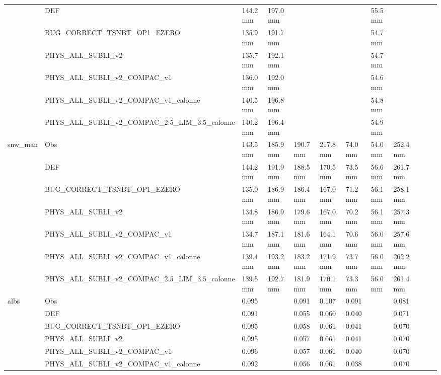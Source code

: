 \begin{tabular}{llllllllllll}
 & DEF & 144.2 mm & 197.0 mm &  &  &  & 55.5 mm &  &  &  &  \\
 & BUG_CORRECT_TSNBT_OP1_EZERO & 135.9 mm & 191.7 mm &  &  &  & 54.7 mm &  &  &  &  \\
 & PHYS_ALL_SUBLI_v2 & 135.7 mm & 192.1 mm &  &  &  & 54.7 mm &  &  &  &  \\
 & PHYS_ALL_SUBLI_v2_COMPAC_v1 & 136.0 mm & 192.0 mm &  &  &  & 54.6 mm &  &  &  &  \\
 & PHYS_ALL_SUBLI_v2_COMPAC_v1_calonne & 140.5 mm & 196.8 mm &  &  &  & 54.8 mm &  &  &  &  \\
 & PHYS_ALL_SUBLI_v2_COMPAC_2.5_LIM_3.5_calonne & 140.2 mm & 196.4 mm &  &  &  & 54.9 mm &  &  &  &  \\
\cline{1-12}
\multirow[t]{7}{*}{snw_man} & Obs & 143.5 mm & 185.9 mm & 190.7 mm & 217.8 mm & 74.0 mm & 54.0 mm & 252.4 mm &  &  &  \\
 & DEF & 144.2 mm & 191.9 mm & 188.5 mm & 170.5 mm & 73.5 mm & 56.6 mm & 261.7 mm &  &  &  \\
 & BUG_CORRECT_TSNBT_OP1_EZERO & 135.0 mm & 186.9 mm & 186.4 mm & 167.0 mm & 71.2 mm & 56.1 mm & 258.1 mm &  &  &  \\
 & PHYS_ALL_SUBLI_v2 & 134.8 mm & 186.9 mm & 179.6 mm & 167.0 mm & 70.2 mm & 56.1 mm & 257.3 mm &  &  &  \\
 & PHYS_ALL_SUBLI_v2_COMPAC_v1 & 134.7 mm & 187.1 mm & 181.6 mm & 164.1 mm & 70.6 mm & 56.0 mm & 257.6 mm &  &  &  \\
 & PHYS_ALL_SUBLI_v2_COMPAC_v1_calonne & 139.4 mm & 193.2 mm & 183.2 mm & 171.9 mm & 73.7 mm & 56.0 mm & 262.2 mm &  &  &  \\
 & PHYS_ALL_SUBLI_v2_COMPAC_2.5_LIM_3.5_calonne & 139.5 mm & 192.7 mm & 181.9 mm & 170.1 mm & 73.3 mm & 56.0 mm & 261.4 mm &  &  &  \\
\cline{1-12}
\multirow[t]{7}{*}{albs} & Obs & 0.095 &  & 0.091 & 0.107 & 0.091 &  & 0.081 &  &  &  \\
 & DEF & 0.091 &  & 0.055 & 0.060 & 0.040 &  & 0.071 &  &  &  \\
 & BUG_CORRECT_TSNBT_OP1_EZERO & 0.095 &  & 0.058 & 0.061 & 0.041 &  & 0.070 &  &  &  \\
 & PHYS_ALL_SUBLI_v2 & 0.095 &  & 0.057 & 0.061 & 0.041 &  & 0.070 &  &  &  \\
 & PHYS_ALL_SUBLI_v2_COMPAC_v1 & 0.096 &  & 0.057 & 0.061 & 0.040 &  & 0.070 &  &  &  \\
 & PHYS_ALL_SUBLI_v2_COMPAC_v1_calonne & 0.092 &  & 0.056 & 0.061 & 0.038 &  & 0.070 &  &  &  \\

\end{tabular}
